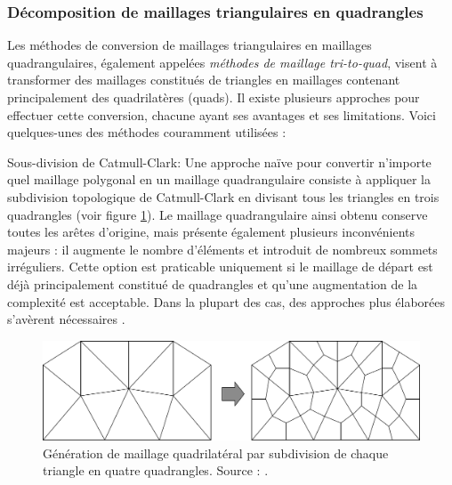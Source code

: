 \subsubsection{Décomposition de maillages triangulaires en quadrangles}

Les méthodes de conversion de maillages triangulaires en maillages quadrangulaires, également appelées \emph{méthodes de maillage tri-to-quad}, visent à transformer des maillages constitués de triangles en maillages contenant principalement des quadrilatères (quads).  Il existe plusieurs approches pour effectuer cette conversion, chacune ayant ses avantages et ses limitations. Voici quelques-unes des méthodes couramment utilisées :

Sous-division de Catmull-Clark: Une approche naïve pour convertir n'importe quel maillage polygonal en un maillage quadrangulaire consiste à appliquer la subdivision topologique de Catmull-Clark \cite{catmull1998recursively} en divisant tous les triangles en trois quadrangles (voir figure \ref{fig:tri_to_quad_1}). Le maillage quadrangulaire ainsi obtenu conserve toutes les arêtes d'origine, mais présente également plusieurs inconvénients majeurs : il augmente le nombre d'éléments et introduit de nombreux sommets irréguliers. Cette option est praticable uniquement si le maillage de départ est déjà principalement constitué de quadrangles et qu'une augmentation de la complexité est acceptable. Dans la plupart des cas, des approches plus élaborées s'avèrent nécessaires \cite{bommes2013quad}.

\begin{figure}[!h]
    \centering
    \includegraphics[scale=0.42]{images/tri_to_quad_1.png}
    \caption{Génération de maillage quadrilatéral par subdivision de chaque triangle en quatre quadrangles. Source : \cite{owen1998survey}.}
    \label{fig:tri_to_quad_1}
\end{figure}

